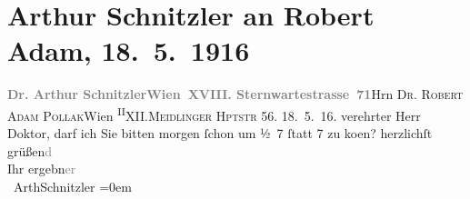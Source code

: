 

               \section[Arthur Schnitzler an Robert Adam, 18. 5. 1916]{ Arthur Schnitzler an Robert Adam, 18. 5. 1916}\nopagebreak{}\rehead{ }\begin{ledgroupsized}[t]{13cm}\normalsize\beginnumbering{} \toendnotes[C]{\smallbreak\pagebreak[2]} 
\pstart{}{\pb}\textcolor{gray}{\textbf{Dr. Arthur Schnitzler}}\pend{}\pstart{}\textcolor{gray}{\textbf{Wien XVIII. Sternwartestrasse 71}}\pend{}{\bigskip}\pstart{}Hrn \textsc{Dr. Robert Adam Pollak}\pend{}\pstart{}Wien \substVorne{}\textsuperscript{II}\substDazwischen{}X\substHinten{}II.\pend{}\pstart{}\textsc{Meidlinger Hptstr} 56.\pend{}{\bigskip}\pstart
           \raggedleft{}{\pb}18. 5. 16.\pend
           \pstart{}verehrter Herr Doktor,\pend\pstart
           darf ich Sie bitten morgen ſchon um ½ 7{ }ſtatt 7 zu ko{\geminationm}en?\pend
           \pstart
           herzlichſt grüßen\textcolor{gray}{d}{\\[\baselineskip]}Ihr ergebn\textcolor{gray}{er}{\\[\baselineskip]}\spacefill\mbox{ ArthSchnitzler}\pend
           \leftskip=0em{}\endnumbering{}\end{ledgroupsized}  \newcommand{\dateiname}{L02228}\newcommand{\titel}{Arthur Schnitzler an Robert Adam, 18. 5. 1916}\newcommand{\editorInnen}{Martin Anton Müller und Gerd-Hermann Susen}
      